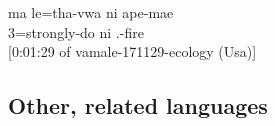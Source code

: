 %
\ea \label{ex:ni}
\gll	ma 	le=tha-vwa ni ape-mae\\
	 3=strongly-do		ni		.-fire\\
\glt		{} {[0:01:29 of vamale-171129-ecology (Usa)]}
\z
%
%
%		
%
%
%	
%	
%		
%


\subsection{Other, related languages}	

